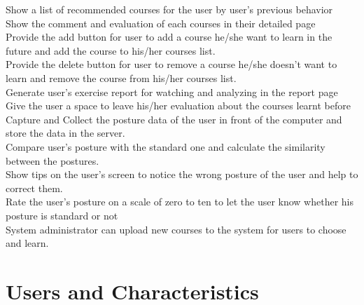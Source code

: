 \documentclass[16pt]{scrreprt}
\begin{document}
 
Show a list of recommended courses for the user by user's previous behavior \\

 
Show the comment and evaluation of each courses in their detailed page\\

 
Provide the add button for user to add a course he/she want to learn in the future and add the course to his/her courses list.\\

 
Provide the delete button for user to remove a course he/she doesn't want to learn and remove the course from his/her courses list.\\


Generate user's exercise report for watching and analyzing in the report page\\
 
Give the user a space to leave his/her evaluation about the courses learnt before\\

Capture and Collect the posture data of the user in front of the computer and store the data in the server.\\


Compare user's posture with the standard one and calculate the similarity between the postures.\\


Show tips on the user's screen to notice the wrong posture of the user and help to correct them.\\


Rate the user's posture on a scale of zero to ten to let the user know whether his posture is standard or not\\


System administrator can upload new courses to the system for users to choose and learn.\\

\section{Users and Characteristics}
\end{document}
